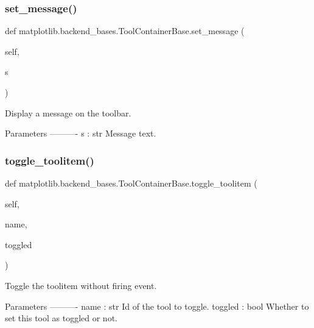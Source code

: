 \subsubsection{\texorpdfstring{set\+\_\+message()}{set\_message()}}
{\footnotesize\ttfamily def matplotlib.\+backend\+\_\+bases.\+Tool\+Container\+Base.\+set\+\_\+message (\begin{DoxyParamCaption}\item[{}]{self,  }\item[{}]{s }\end{DoxyParamCaption})}

\begin{DoxyVerb}Display a message on the toolbar.

Parameters
----------
s : str
    Message text.
\end{DoxyVerb}
 \mbox{\label{classmatplotlib_1_1backend__bases_1_1ToolContainerBase_a15f109cb07c4bc97ee3674243b7bc113}} 
\subsubsection{\texorpdfstring{toggle\+\_\+toolitem()}{toggle\_toolitem()}}
{\footnotesize\ttfamily def matplotlib.\+backend\+\_\+bases.\+Tool\+Container\+Base.\+toggle\+\_\+toolitem (\begin{DoxyParamCaption}\item[{}]{self,  }\item[{}]{name,  }\item[{}]{toggled }\end{DoxyParamCaption})}

\begin{DoxyVerb}Toggle the toolitem without firing event.

Parameters
----------
name : str
    Id of the tool to toggle.
toggled : bool
    Whether to set this tool as toggled or not.
\end{DoxyVerb}
 \mbox{\label{classmatplotlib_1_1backend__bases_1_1ToolContainerBase_ab4fc6d3d15370c43d87345e7a19d2f89}} 
